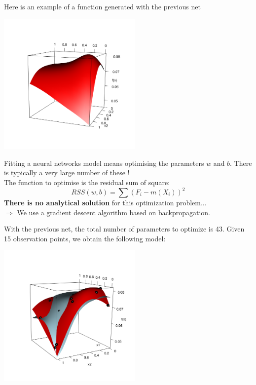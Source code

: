\documentclass{beamer}
\begin{document}
\begin{frame}{}
Here is an example of a function generated with the previous net
\begin{center}
  \includegraphics[height=7cm]{figures/R/neuralnetwork}
\end{center}
\end{frame}

\begin{frame}{}
Fitting a neural networks model means optimising the parameters $w$ and $b$. There is typically a very large number of these ! \\ \vspace{3mm}
The function to optimise is the residual sum of square:
$$ RSS(w,b) = \sum (F_i - m(X_i))^2 $$
\textbf{There is no analytical solution} for this optimization problem... \\
$\Rightarrow $ We use a gradient descent algorithm based on backpropagation.
\end{frame}

\begin{frame}{}
\begin{example}
	With the previous net, the total number of parameters to optimize is 43. Given 15 observation points, we obtain the following model:
	\begin{center}
  \includegraphics[height=7cm]{figures/R/neuralnetworkfit}
\end{center}
\end{example}
\end{frame}
\end{document}
